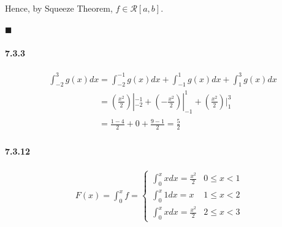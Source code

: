 \documentclass[11pt]{article}
\newcommand{\qed}{
	\begin{flushright}
		$\blacksquare$
	\end{flushright}}
\begin{document}
		Hence, by Squeeze Theorem, $f \in \mathcal{R}[a, b]$.
		\qed
		
		
		
	\paragraph{7.3.3}
		\begin{align}
			&\int_{-2}^3 g(x)dx = \int_{-2}^{-1} g(x)dx + \int_{-1}^{1}g(x)dx + \int_{1}^3 g(x)dx\nonumber\\
			&\phantom{\int_{-2}^3 g(x)dx} = (\frac{x^2}{2})|^{-1}_{-2} + (-\frac{x^2}{2})|^{1}_{-1} + (\frac{x^2}{2})|^{3}_{1}\nonumber\\
			&\phantom{\int_{-2}^3 g(x)dx} = \frac{1 - 4}{2} + 0 + \frac{9 - 1}{2} = \frac{5}{2}\nonumber
		\end{align}
	\paragraph{7.3.12}
		\begin{align}
			F(x) = \int_0^x f = 
			\begin{cases}
				\int^x_0 xdx = \frac{x^2}{2} & 0 \leq x < 1\\
				\int^x_0 1dx = x & 1 \leq x < 2\\
				\int^x_0 xdx = \frac{x^2}{2} & 2 \leq x < 3
			\end{cases}\nonumber
		\end{align}
		
\end{document}
